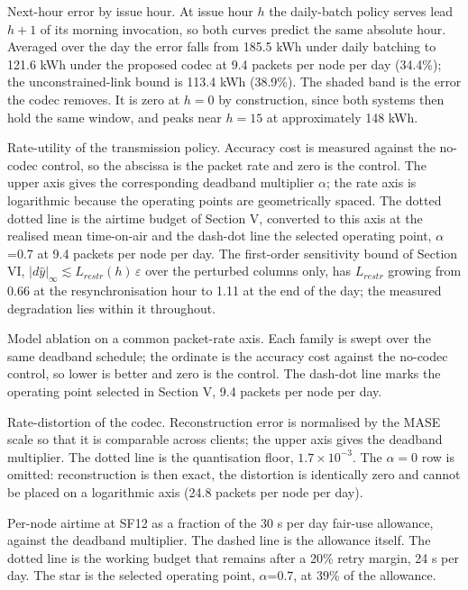 \caption{Next-hour error by issue hour. At issue hour $h$ the daily-batch policy serves lead $h{+}1$ of its morning invocation, so both curves predict the same absolute hour. Averaged over the day the error falls from 185.5 kWh under daily batching to 121.6 kWh under the proposed codec at 9.4 packets per node per day (34.4\%); the unconstrained-link bound is 113.4 kWh (38.9\%). The shaded band is the error the codec removes. It is zero at $h=0$ by construction, since both systems then hold the same window, and peaks near $h=15$ at approximately 148 kWh.}

\caption{Rate-utility of the transmission policy. Accuracy cost is measured against the no-codec control, so the abscissa is the packet rate and zero is the control. The upper axis gives the corresponding deadband multiplier $\alpha$; the rate axis is logarithmic because the operating points are geometrically spaced. The dotted dotted line is the airtime budget of Section V, converted to this axis at the realised mean time-on-air and the dash-dot line the selected operating point, $\alpha$=0.7 at 9.4 packets per node per day. The first-order sensitivity bound of Section VI, $|d\hat{y}|_\infty \lesssim L_{restr}(h)\,\varepsilon$ over the perturbed columns only, has $L_{restr}$ growing from 0.66 at the resynchronisation hour to 1.11 at the end of the day; the measured degradation lies within it throughout.}

\caption{Model ablation on a common packet-rate axis. Each family is swept over the same deadband schedule; the ordinate is the accuracy cost against the no-codec control, so lower is better and zero is the control. The dash-dot line marks the operating point selected in Section V, 9.4 packets per node per day.}

\caption{Rate-distortion of the codec. Reconstruction error is normalised by the MASE scale so that it is comparable across clients; the upper axis gives the deadband multiplier. The dotted line is the quantisation floor, $1.7\times10^{-3}$. The $\alpha=0$ row is omitted: reconstruction is then exact, the distortion is identically zero and cannot be placed on a logarithmic axis (24.8 packets per node per day).}

\caption{Per-node airtime at SF12 as a fraction of the 30 s per day fair-use allowance, against the deadband multiplier. The dashed line is the allowance itself. The dotted line is the working budget that remains after a 20\% retry margin, 24 s per day. The star is the selected operating point, $\alpha$=0.7, at 39\% of the allowance.}

